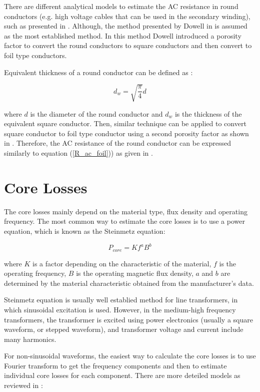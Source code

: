 \documentclass[a4paper, 11pt]{article} %
\begin{document}
There are different analytical models to estimate the AC resistance in round conductors (e.g. high voltage cables that can be used in the secondary winding), such as presented in \cite{Sullivan2003,Ferreira1994}. Although, the method presented by Dowell in \cite{Dowell1966} is assumed as the most established method. In this method Dowell introduced a porosity factor to convert the round conductors to square conductors and then convert to foil type conductors.

Equivalent thickness of a round conductor can be defined as \cite{Dowell1966}:

\begin{equation}

 d_w =  \sqrt{\frac{\pi}{4}} d 
\end{equation}

where $d$ is the diameter of the round conductor and $d_w$ is the thickness of the equivalent square conductor. Then, similar technique can be applied to convert square conductor to foil type conductor using a second porosity factor as shown in \cite{Villar2010}. Therefore, the AC resistance of the round conductor can be expressed similarly to equation (\ref{R_ac_foil})) as given in \cite{Villar2010}.


\section{Core Losses}

The core losses mainly depend on the material type, flux density and operating frequency. The most common way to estimate the core losses is to use a power equation, which is known as the Steinmetz equation:

\begin{equation}
 P_{core} = K f^a B^b
\end{equation}

where $K$ is a factor depending on the characteristic of the material, $f$ is the operating frequency, $B$ is the operating magnetic flux density, $a$ and $b$ are determined by the material characteristic obtained from the manufacturer's data.

Steinmetz equation is usually well establied method for line transformers, in which sinusoidal excitation is used. However, in the medium-high frequency transformers, the transformer is excited using power electronics (usually a square waveform, or stepped waveform), and transformer voltage and current include many harmonics.

For non-sinusoidal waveforms, the easiest way to calculate the core losses is to use Fourier transform to get the frequency components and then to estimate individual core losses for each component. There are more deteiled models as reviewed in \cite{Villar2010}:
\end{document}

